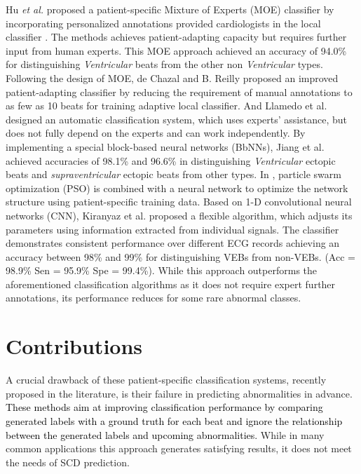 Hu \textit{et al.} proposed a patient-specific Mixture of Experts (MOE) classifier by incorporating personalized annotations provided cardiologists in the local classifier \cite{Hu_et_al}. The methods achieves patient-adapting capacity but requires further input from human experts. This MOE approach achieved an accuracy of 94.0\% for distinguishing \textit{Ventricular} beats from the other non \textit{Ventricular} types. Following the design of MOE, de Chazal and B. Reilly proposed an improved patient-adapting classifier by reducing the requirement of manual annotations to as few as 10 beats for training adaptive local classifier\cite{deChazal2006}. And Llamedo et al. designed an automatic classification system, which uses experts' assistance, but does not fully depend on the experts and can work independently\cite{llamedo2012automatic}. By implementing a special block-based neural networks (BbNNs), Jiang et al. achieved accuracies of 98.1\% and 96.6\% in distinguishing \textit{Ventricular} ectopic beats and \textit{supraventricular} ectopic beats from other types\cite{bbnn}. In \cite{ince2009generic}, particle swarm optimization (PSO) is combined with a neural network to optimize the network structure using patient-specific training data. Based on 1-D convolutional neural networks (CNN), Kiranyaz et al. proposed a flexible algorithm, which adjusts its parameters using information extracted from individual signals\cite{Kiranyaz}. The classifier demonstrates consistent performance over different ECG records achieving an accuracy between 98\% and 99\% for distinguishing VEBs from non-VEBs. (Acc = 98.9\%  Sen = 95.9\% Spe =  99.4\%). While this approach outperforms the aforementioned classification algorithms as it does not require expert further annotations, its performance reduces for some rare abnormal classes. 
 
\section{Contributions}

A crucial drawback of these patient-specific classification systems, recently proposed in the literature, is their failure in predicting abnormalities in advance. \textcolor{black}{These methods aim at improving classification performance by comparing generated labels with a ground truth for each beat and ignore the relationship between the generated labels and upcoming abnormalities. }%
While in many common applications this approach generates satisfying results, it does not meet the needs of SCD prediction. %

